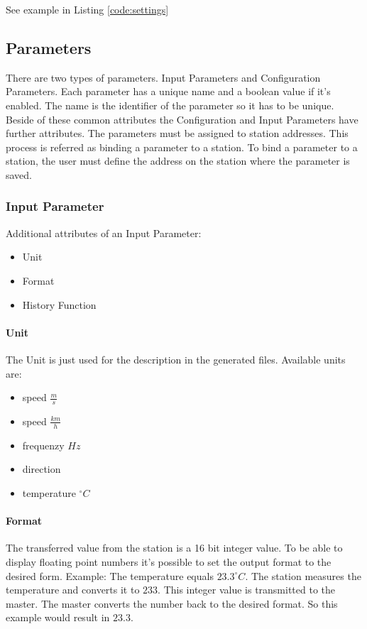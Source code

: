 See example in Listing \ref{code:settings}

{\C  }

\subsection{Parameters} %
\label{sub:parameters}
There are two types of parameters. Input Parameters and Configuration Parameters. Each parameter has a unique name and a boolean value if it's enabled. The name is the identifier of the parameter so it has to be unique. Beside of these common attributes the Configuration and Input Parameters have further attributes. The parameters must be assigned to station addresses. This process is referred as binding a parameter to a station. To bind a parameter to a station, the user must define the address on the station where the parameter is saved.

\subsubsection{Input Parameter} %
\label{ssub:input_parameter}
Additional attributes of an Input Parameter:
\begin{itemize}
	\item Unit
	\item Format
	\item History Function
\end{itemize}

\paragraph{Unit} %
\label{par:unit}
The Unit is just used for the description in the generated files. Available units are:
\begin{itemize}
	\item speed $\frac{m}{s}$
	\item speed $\frac{km}{h}$
	\item frequenzy $Hz$
	\item direction
	\item temperature $^\circ C$
\end{itemize}


\paragraph{Format} %
\label{par:format}
The transferred value from the station is a 16 bit integer value. To be able to display floating point numbers it's possible to set the output format to the desired form. Example: The temperature equals $23.3 ^\circ C$. The station measures the temperature and converts it to $233$. This integer value is transmitted to the master. The master converts the number back to the desired format. So this example would result in $23.3$.

